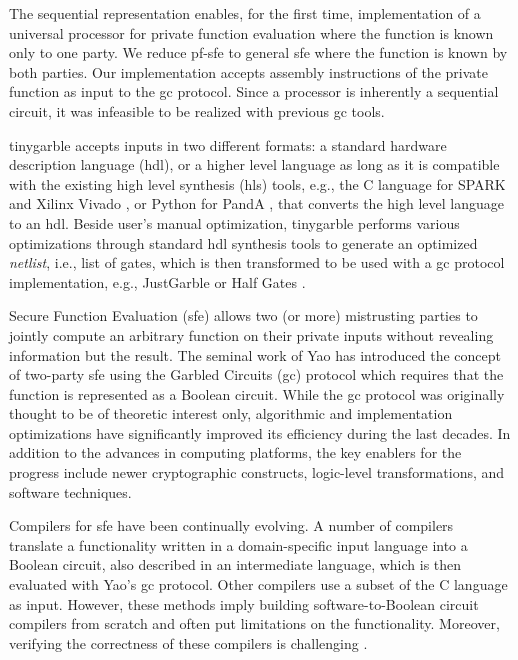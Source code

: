 The sequential representation enables, for the first time, implementation of a universal processor for private function evaluation where the function is known only to one party.
We reduce \acrfull{pf-sfe} to general \acrshort{sfe} where the function is known by both parties.
Our implementation accepts assembly instructions of the private function as input to the \acrshort{gc} protocol.
Since a processor is inherently a sequential circuit, it was infeasible to be realized with previous \acrshort{gc} tools.

\gls{tinygarble} accepts inputs in two different formats: a standard hardware description language (\acrshort{hdl}), or a higher level language as long as it is compatible with the existing high level synthesis (\acrshort{hls}) tools, e.g., the C language for  SPARK \cite{Gupta2004} and Xilinx Vivado \cite{tool:Vivado}, or Python for PandA \cite{tool:PandA}, that converts the high level language to an \acrshort{hdl}.
Beside user's manual optimization, \gls{tinygarble} performs various optimizations through standard \acrshort{hdl} synthesis tools to generate an optimized \emph{netlist}, i.e., list of gates, which is then transformed to be used with a \acrshort{gc} protocol implementation, e.g., JustGarble \cite{bellare2013efficient} or Half Gates \cite{zahur2015two}.


Secure Function Evaluation (\acrshort{sfe}) allows two (or more) mistrusting parties to jointly compute an arbitrary function on their private inputs without revealing information but the result. The seminal work of Yao \cite{yao1986generate} has introduced the concept of two-party \acrshort{sfe} using the Garbled Circuits (\acrshort{gc}) protocol which requires that the function is represented as a Boolean circuit. While the \acrshort{gc} protocol was originally thought to be of theoretic interest only, algorithmic and implementation optimizations have significantly improved its efficiency during the last decades. In addition to the advances in computing platforms, the key enablers for the progress include newer cryptographic constructs, logic-level transformations, and software techniques.

Compilers for \acrshort{sfe} have been continually evolving. A number of compilers~\cite{malkhi2004fairplay,ben2008fairplaymp,henecka2010tasty,kreuter2012billion} translate a functionality written in a domain-specific input language into a Boolean circuit, also described in an intermediate language, which is then evaluated with Yao's \acrshort{gc} protocol. Other compilers \cite{franz2014cbmc,kreuter2013pcf} use a subset of the C language as input. However, these methods imply building software-to-Boolean circuit compilers from scratch and often put limitations on the functionality. Moreover, verifying the correctness of these compilers is challenging \cite{mood2016frigate}.

